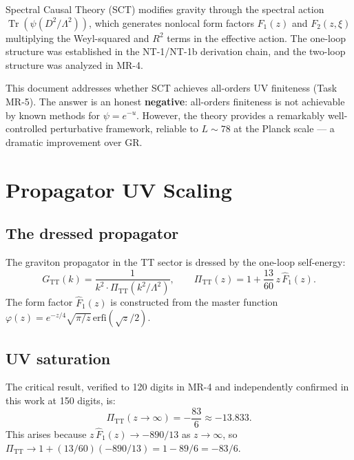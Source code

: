 \documentclass[12pt,a4paper]{article}
\newcommand{\Tr}{\operatorname{Tr}}
\newcommand{\Lam}{\Lambda}
\begin{document}
Spectral Causal Theory (SCT) modifies gravity through the spectral action
$\Tr(\psi(D^2/\Lam^2))$, which generates nonlocal form factors
$F_1(z)$ and $F_2(z,\xi)$ multiplying the Weyl-squared and $R^2$ terms
in the effective action. The one-loop structure was established in the
NT-1/NT-1b derivation chain, and the two-loop structure was analyzed in MR-4.

This document addresses whether SCT achieves all-orders UV finiteness
(Task MR-5). The answer is an honest \textbf{negative}: all-orders finiteness
is not achievable by known methods for $\psi = e^{-u}$. However, the theory
provides a remarkably well-controlled perturbative framework, reliable to
$L \sim 78$ at the Planck scale --- a dramatic improvement over GR.

\section{Propagator UV Scaling}
\label{sec:propagator}

\subsection{The dressed propagator}

The graviton propagator in the TT sector is dressed by the one-loop self-energy:
\begin{equation}\label{eq:Pi_TT}
  G_{\mathrm{TT}}(k) = \frac{1}{k^2 \cdot \Pi_{\mathrm{TT}}(k^2/\Lam^2)},
  \qquad
  \Pi_{\mathrm{TT}}(z) = 1 + \frac{13}{60}\,z\,\hat{F}_1(z).
\end{equation}
The form factor $\hat{F}_1(z)$ is constructed from the master function
$\varphi(z) = e^{-z/4}\sqrt{\pi/z}\,\mathrm{erfi}(\sqrt{z}/2)$.

\subsection{UV saturation}

The critical result, verified to 120 digits in MR-4 and independently confirmed
in this work at 150 digits, is:
\begin{equation}\label{eq:saturation}
  \Pi_{\mathrm{TT}}(z \to \infty) = -\frac{83}{6} \approx -13.833.
\end{equation}
This arises because $z\,\hat{F}_1(z) \to -890/13$ as $z \to \infty$, so
$\Pi_{\mathrm{TT}} \to 1 + (13/60)(-890/13) = 1 - 89/6 = -83/6$.
\end{document}
